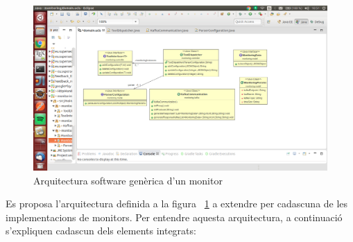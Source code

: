 \begin{figure}
\centering
\includegraphics[width=14cm]{Figures/Figure5}
\decoRule
\caption[Arquitectura software genèrica d'un monitor]{Arquitectura software genèrica d'un monitor}
\label{fig:Figura5}
\end{figure}

Es proposa l'arquitectura definida a la figura ~\ref{fig:Figura5} a extendre per cadascuna de les implementacions de monitors. Per entendre aquesta arquitectura, a continuació s'expliquen cadascun dels elements integrats:


